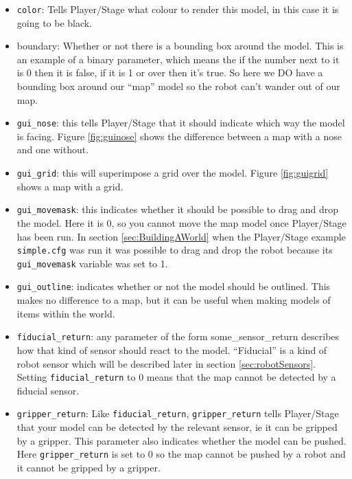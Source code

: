 \documentclass[a4paper]{report}
\newcommand{\plst}{Player/Stage\xspace}
\begin{document}
\begin{itemize}
\item \verb|color|: Tells \plst what colour to render this model, in this case it is going to be black. 
\item boundary: Whether or not there is a bounding box around the model. This is an example of a binary parameter, which means the if the number next to it is 0 then it is false, if it is 1 or over then it's true. So here we DO have a bounding box around our ``map'' model so the robot can't wander out of our map.
\item \verb|gui_nose|: this tells \plst that it should indicate which way the model is facing. Figure \ref{fig:guinose} shows the difference between a map with a nose and one without.
\item \verb|gui_grid|: this will superimpose a grid over the model. Figure \ref{fig:guigrid} shows a map with a grid.
\item \verb|gui_movemask|: this indicates whether it should be possible to drag and drop the model. Here it is 0, so you cannot move the map model once \plst has been run. In section \ref{sec:BuildingAWorld} when the \plst example \verb|simple.cfg| was run it was possible to drag and drop the robot because its \verb|gui_movemask| variable was set to 1.
\item \verb|gui_outline|: indicates whether or not the model should be outlined. This makes no difference to a map, but it can be useful when making models of items within the world.


\item \verb|fiducial_return|: any parameter of the form some\_sensor\_return describes how that kind of sensor should react to the model. ``Fiducial'' is a kind of robot sensor which will be described later in section \ref{sec:robotSensors}. Setting \verb|fiducial_return| to 0 means that the map cannot be detected by a fiducial sensor.
\item \verb|gripper_return|: Like \verb|fiducial_return|, \verb|gripper_return| tells \plst that your model can be detected by the relevant sensor, ie it can be gripped by a gripper. This parameter also indicates whether the model can be pushed. Here \verb|gripper_return| is set to 0 so the map cannot be pushed by a robot and it cannot be gripped by a gripper.
\end{itemize}
\end{document}
